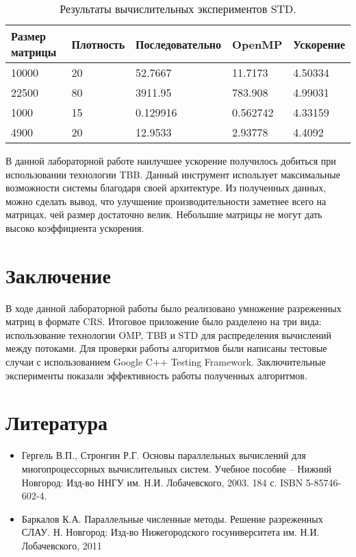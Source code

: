 \documentclass{report}
\begin{document}
\begin{table}[!h]
\begin{tabular}{ | l | l | l | l | | l }
\hline
Размер матрицы & Плотность & Последовательно & OpenMP & Ускорение \\ \hline
10000& 20 & 52.7667 & 11.7173 & 4.50334 \\
22500& 80 & 3911.95 & 783.908 & 4.99031 \\
1000 & 15 & 0.129916 & 0.562742 & 4.33159 \\
4900 & 20 & 12.9533 & 2.93778 & 4.4092 \\ \hline
\end{tabular}
\caption{Результаты вычислительных экспериментов STD.}
\end{table}
\newpage
\par В данной лабораторной работе наилучшее ускорение получилось добиться при использовании технологии TBB. Данный инструмент использует максимальные возможности системы благодаря своей архитектуре. Из полученных данных, можно сделать вывод, что улучшение производительности заметнее всего на матрицах, чей размер достаточно велик. Небольшие матрицы не могут дать высоко коэффициента ускорения.
\newpage
\section*{Заключение}
\par В ходе данной лабораторной работы было реализовано умножение разреженных матриц в формате CRS. Итоговое приложение было разделено на три вида: использование технологии OMP, TBB и STD для распределения вычислений между потоками. Для проверки работы алгоритмов были написаны тестовые случаи с использованием Google C++ Testing Framework. Заключительные эксперименты показали эффективность работы полученных алгоритмов.
\newpage
\section*{Литература}
\begin{itemize}
\item Гергель В.П., Стронгин Р.Г. Основы параллельных вычислений для многопроцессорных вычислительных систем. Учебное пособие – Нижний Новгород: Изд-во ННГУ им. Н.И. Лобачевского, 2003. 184 с. ISBN 5-85746-602-4.
\item Баркалов К.А. Параллельные численные методы. Решение разреженных СЛАУ. Н. Новгород: Изд-во Нижегородского госуниверситета им. Н.И. Лобачевского, 2011
\end{itemize}
\newpage
\end{document}
